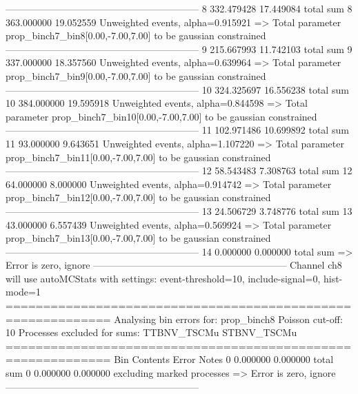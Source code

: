 ------------------------------------------------------------
8          332.479428      17.449084       total sum                     
8          363.000000      19.052559       Unweighted events, alpha=0.915921
  => Total parameter prop_binch7_bin8[0.00,-7.00,7.00] to be gaussian constrained
------------------------------------------------------------
9          215.667993      11.742103       total sum                     
9          337.000000      18.357560       Unweighted events, alpha=0.639964
  => Total parameter prop_binch7_bin9[0.00,-7.00,7.00] to be gaussian constrained
------------------------------------------------------------
10         324.325697      16.556238       total sum                     
10         384.000000      19.595918       Unweighted events, alpha=0.844598
  => Total parameter prop_binch7_bin10[0.00,-7.00,7.00] to be gaussian constrained
------------------------------------------------------------
11         102.971486      10.699892       total sum                     
11         93.000000       9.643651        Unweighted events, alpha=1.107220
  => Total parameter prop_binch7_bin11[0.00,-7.00,7.00] to be gaussian constrained
------------------------------------------------------------
12         58.543483       7.308763        total sum                     
12         64.000000       8.000000        Unweighted events, alpha=0.914742
  => Total parameter prop_binch7_bin12[0.00,-7.00,7.00] to be gaussian constrained
------------------------------------------------------------
13         24.506729       3.748776        total sum                     
13         43.000000       6.557439        Unweighted events, alpha=0.569924
  => Total parameter prop_binch7_bin13[0.00,-7.00,7.00] to be gaussian constrained
------------------------------------------------------------
14         0.000000        0.000000        total sum                     
  => Error is zero, ignore      
------------------------------------------------------------
Channel ch8 will use autoMCStats with settings: event-threshold=10, include-signal=0, hist-mode=1
============================================================
Analysing bin errors for: prop_binch8
Poisson cut-off: 10
Processes excluded for sums: TTBNV_TSCMu STBNV_TSCMu
============================================================
Bin        Contents        Error           Notes                         
0          0.000000        0.000000        total sum                     
0          0.000000        0.000000        excluding marked processes    
  => Error is zero, ignore      
------------------------------------------------------------
